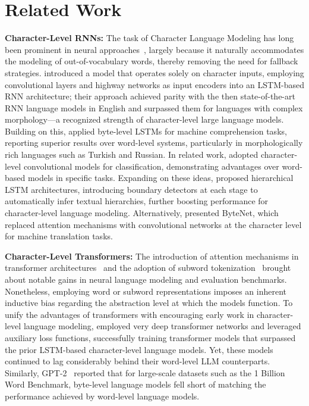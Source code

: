 \section{Related Work}
\label{section:related_work}

\textbf{Character-Level RNNs:} The task of Character Language Modeling has long been prominent in neural approaches~\citep{sutskever2011generating,mikolov2012subword,graves2013generating}, largely because it naturally accommodates the modeling of out-of-vocabulary words, thereby removing the need for fallback strategies. \cite{kim2016character} introduced a model that operates solely on character inputs, employing convolutional layers and highway networks as input encoders into an LSTM-based RNN architecture; their approach achieved parity with the then state-of-the-art RNN language models in English and surpassed them for languages with complex morphology—a recognized strength of character-level large language models. Building on this, \cite{kenter2018byte} applied byte-level LSTMs for machine comprehension tasks, reporting superior results over word-level systems, particularly in morphologically rich languages such as Turkish and Russian. In related work, \cite{zhang2015character} adopted character-level convolutional models for classification, demonstrating advantages over word-based models in specific tasks. Expanding on these ideas, \citet{chung2019hierarchical} proposed hierarchical LSTM architectures, introducing boundary detectors at each stage to automatically infer textual hierarchies, further boosting performance for character-level language modeling. Alternatively, \cite{kalchbrenner2016neural} presented ByteNet, which replaced attention mechanisms with convolutional networks at the character level for machine translation tasks.

\textbf{Character-Level Transformers:} The introduction of attention mechanisms in transformer architectures~\citep{vaswani2017attention} and the adoption of subword tokenization~\citep{sennrich-etal-2016-neural} brought about notable gains in neural language modeling and evaluation benchmarks. Nonetheless, employing word or subword representations imposes an inherent inductive bias regarding the abstraction level at which the models function. To unify the advantages of transformers with encouraging early work in character-level language modeling, \citet{al2019character} employed very deep transformer networks and leveraged auxiliary loss functions, successfully training transformer models that surpassed the prior LSTM-based character-level language models. Yet, these models continued to lag considerably behind their word-level LLM counterparts. Similarly, GPT-2~\citep{radfordgpt2} reported that for large-scale datasets such as the 1 Billion Word Benchmark, byte-level language models fell short of matching the performance achieved by word-level language models.

